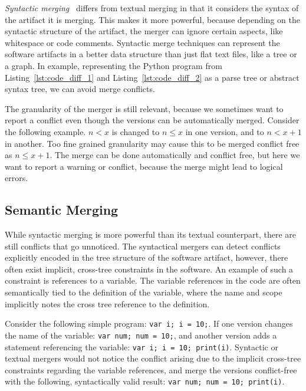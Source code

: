 \documentclass[a4paper,english]{ifimaster}
\begin{document}
\textit{Syntactic merging}~\cite{cite:syntactic_software_merging} differs from textual merging in that it considers the syntax of the artifact it is merging. This makes it more powerful, because depending on the syntactic structure of the artifact, the merger can ignore certain aspects, like whitespace or code comments. Syntactic merge techniques can represent the software artifacts in a better data structure than just flat text files, like a tree or a graph. In example, representing the Python program from Listing~\vref{lst:code_diff_1} and Listing~\vref{lst:code_diff_2} as a parse tree or abstract syntax tree, we can avoid merge conflicts.

The granularity of the merger is still relevant, because we sometimes want to report a conflict even though the versions can be automatically merged. Consider the following example. $n < x$ is changed to $n \leq x$ in one version, and to $n < x + 1$ in another. Too fine grained granularity may cause this to be merged conflict free as $n \leq x + 1$. The merge can be done automatically and conflict free, but here we want to report a warning or conflict, because the merge might lead to logical errors.

\subsection{Semantic Merging}%
\label{sub:semantic_merging}

While syntactic merging is more powerful than its textual counterpart, there are still conflicts that go unnoticed. The syntactical mergers can detect conflicts explicitly encoded in the tree structure of the software artifact, however, there often exist implicit, cross-tree constraints in the software. An example of such a constraint is references to a variable. The variable references in the code are often semantically tied to the definition of the variable, where the name and scope implicitly notes the cross tree reference to the definition.

Consider the following simple program: \texttt{var i; i = 10;}. If one version changes the name of the variable: \texttt{var num; num = 10;}, and another version adds a statement referencing the variable: \texttt{var i; i = 10; print(i)}. Syntactic or textual mergers would not notice the conflict arising due to the implicit cross-tree constraints regarding the variable references, and merge the versions conflict-free with the following, syntactically valid result: \texttt{var num; num = 10; print(i)}.
\end{document}

